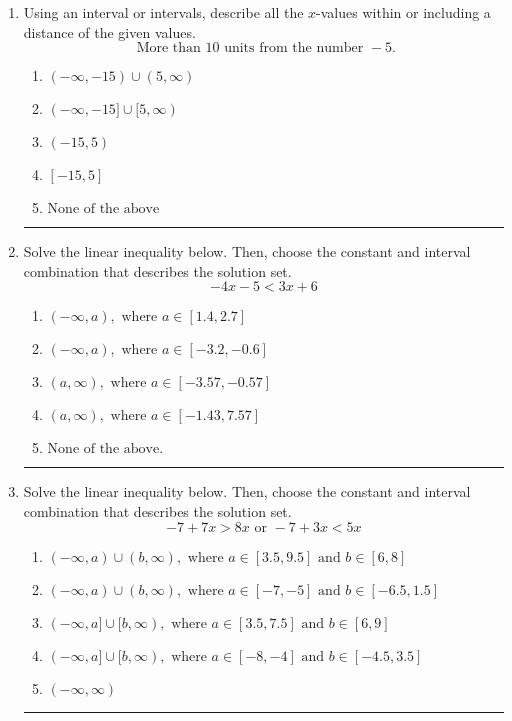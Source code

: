 \documentclass[14pt]{extbook}
\newcommand{\litem}[1]{\item#1\hspace*{-1cm}\rule{\textwidth}{0.4pt}}
\begin{document}
\begin{enumerate}
\litem{
Using an interval or intervals, describe all the $x$-values within or including a distance of the given values.\[ \text{ More than } 10 \text{ units from the number } -5. \]\begin{enumerate}[label=\Alph*.]
\item \( (-\infty, -15) \cup (5, \infty) \)
\item \( (-\infty, -15] \cup [5, \infty) \)
\item \( (-15, 5) \)
\item \( [-15, 5] \)
\item \( \text{None of the above} \)

\end{enumerate} }
\litem{
Solve the linear inequality below. Then, choose the constant and interval combination that describes the solution set.\[ -4x -5 < 3x + 6 \]\begin{enumerate}[label=\Alph*.]
\item \( (-\infty, a), \text{ where } a \in [1.4, 2.7] \)
\item \( (-\infty, a), \text{ where } a \in [-3.2, -0.6] \)
\item \( (a, \infty), \text{ where } a \in [-3.57, -0.57] \)
\item \( (a, \infty), \text{ where } a \in [-1.43, 7.57] \)
\item \( \text{None of the above}. \)

\end{enumerate} }
\litem{
Solve the linear inequality below. Then, choose the constant and interval combination that describes the solution set.\[ -7 + 7 x > 8 x \text{ or } -7 + 3 x < 5 x \]\begin{enumerate}[label=\Alph*.]
\item \( (-\infty, a) \cup (b, \infty), \text{ where } a \in [3.5, 9.5] \text{ and } b \in [6, 8] \)
\item \( (-\infty, a) \cup (b, \infty), \text{ where } a \in [-7, -5] \text{ and } b \in [-6.5, 1.5] \)
\item \( (-\infty, a] \cup [b, \infty), \text{ where } a \in [3.5, 7.5] \text{ and } b \in [6, 9] \)
\item \( (-\infty, a] \cup [b, \infty), \text{ where } a \in [-8, -4] \text{ and } b \in [-4.5, 3.5] \)
\item \( (-\infty, \infty) \)


\end{enumerate}}
\end{enumerate}
\end{document}

